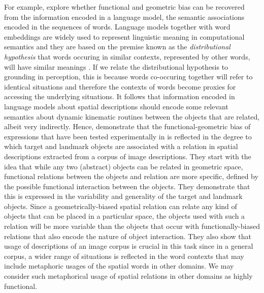 For example, \cite{Dobnik:2013aa,Dobnik:2014ab,dobnik-etal-2018-exploring} explore
whether functional and geometric bias can be recovered from the
information encoded in a language model, the semantic associations
encoded in the sequences of words. Language models together with word
embeddings \cite{Bengio:2003aa} are widely used to represent
linguistic meaning in computational semantics and they are based on
the premise known as the \emph{distributional hypothesis}
\cite{Firth:1957aa} that words occuring in similar contexts,
represented by other words, will have similar meanings
\cite{Turney:2010aa}. If we relate the distributional hypothesis to grounding in perception, this is because words co-occuring together will
refer to identical situations and therefore the contexts of words become
proxies for accessing the underlying situations. It follows that information encoded in
language models about spatial descriptions should encode some relevant
semantics about dynamic kinematic routines between the objects that
are related, albeit very indirectly. Hence,
\cite{Dobnik:2013aa,Dobnik:2014ab,dobnik-etal-2018-exploring} demonstrate that the
functional-geometric bias of expressions that have been tested
experimentally in \cite{CoventryEtAl:2001} is reflected in the degree
to which target and landmark objects are associated with a relation in
spatial descriptions extracted from a corpus of image
descriptions. They start with the idea that while any two (abstract)
objects can be related in geometric space, functional relations
between the objects and relation are more specific, defined by the
possible functional interaction between the objects. They demonstrate
that this is expressed in the variability and generality of the target
and landmark objects. Since a geometrically-biased spatial relation
can relate any kind of objects that can be placed in a particular
space, the objects used with such a relation will be more variable
than the objects that occur with functionally-biased relations that
also encode the nature of object interaction. They also show that
usage of descriptions of an image corpus is crucial in this task since
in a general corpus, a wider range of situations is reflected in the
word contexts that may include metaphoric usages of the spatial words
in other domains. We may consider such metaphorical usage of spatial
relations in other domains as highly functional.



